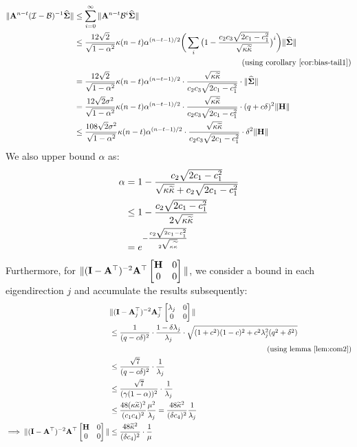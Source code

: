 \begin{align}
\label{eq:e311}
\|\mathbf{A}^{n-t}(\mathcal{I}-\mathcal{B})^{-1}\mathbf{\widehat{\Sigma}}\|&\leq\sum_{i=0}^{\infty}\|\mathbf{A}^{n-t}\mathcal{B}^i\mathbf{\widehat{\Sigma}}\|\nonumber\\
&\leq\frac{12\sqrt{2}}{\sqrt{1-\alpha^2}}{\kappa}(n-t)\alpha^{(n-t-1)/2}\bigg(\sum_{i}\big(1-\frac{c_2c_3\sqrt{2c_1-c_1^2}}{\sqrt{{\kappa}\widetilde{\kappa}}}\big)^i\bigg)\|\mathbf{\widehat{\Sigma}}\|\nonumber\\&\qquad\qquad\qquad\qquad\qquad\qquad\qquad\qquad\qquad\qquad\quad(\text{using corollary}~\ref{cor:bias-tail1})\nonumber\\
&=\frac{12\sqrt{2}}{\sqrt{1-\alpha^2}}{\kappa}(n-t)\alpha^{(n-t-1)/2}\cdot\frac{\sqrt{{\kappa}\widetilde{\kappa}}}{c_2c_3\sqrt{2c_1-c_1^2}}\cdot\|\mathbf{\widehat{\Sigma}}\|\nonumber\\
&=\frac{12\sqrt{2}\sigma^2}{\sqrt{1-\alpha^2}}{\kappa}(n-t)\alpha^{(n-t-1)/2}\cdot\frac{\sqrt{{\kappa}\widetilde{\kappa}}}{c_2c_3\sqrt{2c_1-c_1^2}}\cdot(q+c\delta)^2\|\mathbf{H}\|\nonumber\\
&\leq\frac{108\sqrt{2}\sigma^2}{\sqrt{1-\alpha^2}}{\kappa}(n-t)\alpha^{(n-t-1)/2}\cdot\frac{\sqrt{{\kappa}\widetilde{\kappa}}}{c_2c_3\sqrt{2c_1-c_1^2}}\cdot\delta^2\|\mathbf{H}\|
\end{align}
We also upper bound $\alpha$ as:
\begin{align}
\label{eq:alpBound}
\alpha&=1-\frac{\ctwo\sqrt{2\cone-\cone^2}}{\sqrt{\cnH\cnS}+\ctwo\sqrt{2\cone-\cone^2}}\nonumber\\
&\leq1-\frac{\ctwo\sqrt{2\cone-\cone^2}}{2\sqrt{\cnH\cnS}}\nonumber\\
&=e^{-\frac{\ctwo\sqrt{2\cone-\cone^2}}{2\sqrt{\cnH\cnS}}}%
\end{align}
Furthermore, for $\|(\mathbf{I}-\mathbf{A}^{\top})^{-2}\mathbf{A}^{\top}\begin{bmatrix}\mathbf{H}&0\\0&0\end{bmatrix}\|$, we consider a bound in each eigendirection $j$ and accumulate the results subsequently:
\begin{align*}
&\|(\mathbf{I}-\mathbf{A}_j^{\top})^{-2}\mathbf{A}_j^{\top}\begin{bmatrix}\lambda_j&0\\0&0\end{bmatrix}\|\\&\leq\frac{1}{(q-c\delta)^2}\cdot\frac{1-\delta\lambda_j}{\lambda_j}\cdot\sqrt{(1+c^2)(1-c)^2+c^2\lambda_j^2(q^2+\delta^2)}\nonumber\\&\qquad\qquad\qquad\qquad\qquad\qquad\qquad\qquad\qquad\qquad\quad(\text{using lemma}~\ref{lem:com2})\\
&\leq\frac{\sqrt{7}}{(q-c\delta)^2}\cdot\frac{1}{\lambda_j}\\
&\leq\frac{\sqrt{7}}{(\gamma(1-\alpha))^2}\cdot\frac{1}{\lambda_j}\\
&\leq\frac{48({\kappa}\widetilde{\kappa})^2}{(c_1c_4)^2}\frac{\mu^2}{\lambda_j}=\frac{48\widetilde{\kappa}^2}{(\delta c_4)^2}\frac{1}{\lambda_j}\\
\implies\|(\mathbf{I}-\mathbf{A}^{\top})^{-2}\mathbf{A}^{\top}\begin{bmatrix}\mathbf{H}&0\\0&0\end{bmatrix}\|&\leq\frac{48\widetilde{\kappa}^2}{(\delta c_4)^2}\cdot\frac{1}{\mu}
\end{align*}
